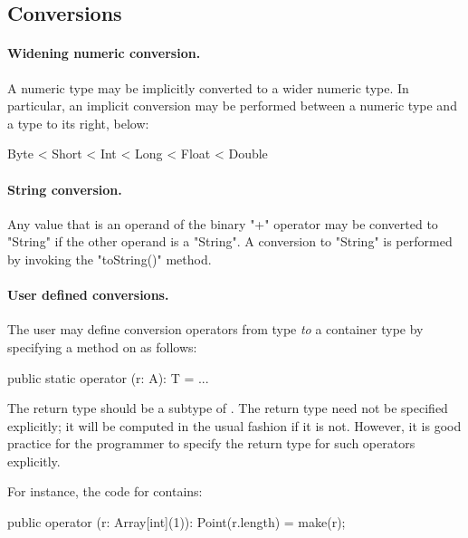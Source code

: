 \subsection{Conversions}

\paragraph{Widening numeric conversion.}
\label{WideningConversions}
A numeric type may be implicitly converted to a wider numeric type. In
particular, an implicit conversion may be performed between a numeric
type and a type to its right, below:

\begin{xten}
Byte < Short < Int < Long < Float < Double
\end{xten}


\paragraph{String conversion.}
Any value that is an operand of the binary
\xcd"+" operator may
be converted to \xcd"String" if the other operand is a \xcd"String".
A conversion to \xcd"String" is performed by invoking the \xcd"toString()"
method.


\paragraph{User defined conversions.}\label{sec:user-defined-conversions}

The user may define conversion operators from type  {\em to} a
container type  by specifying a method on  as follows:

\begin{xten}
  public static operator (r: A): T = ... 
\end{xten}

The return type  should be a subtype of . The return
type need not be specified explicitly; it will be computed in the
usual fashion if it is not. However, it is good practice for the
programmer to specify the return type for such operators explicitly.

For instance, the code for  contains:

\begin{xten}
  public operator (r: Array[int](1)): Point(r.length) = make(r);
\end{xten}

